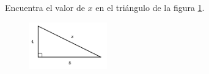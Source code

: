 \question[15]  Encuentra el valor de $x$ en el triángulo de la figura \ref{fig:lados_pitagoras_15}.
\begin{figure}[H]
    \begin{center}
        \includegraphics[width=0.3\textwidth]{../images/lados_pitagoras_15.png}
    \end{center}
    \caption{}
    \label{fig:lados_pitagoras_15}
\end{figure}